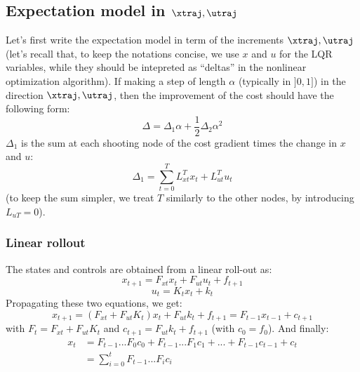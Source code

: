 \documentclass[10pt,a4paper]{article}
\begin{document}
\subsection{Expectation model in $\xtraj,\utraj$}
Let's first write the expectation model in term of the increments $\xtraj,\utraj$ (let's recall that, to keep the notations concise, we use $x$ and $u$ for the LQR variables, while they should be intepreted as ``deltas'' in the nonlinear optimization algorithm).
If making a step of length $\alpha$ (typically in $]0,1]$) in the direction $\xtraj,\utraj$, then the improvement of the cost should have the following form:
$$\Delta = \Delta_1 \alpha + \frac{1}{2} \Delta_2 \alpha^2$$
$\Delta_1$ is the sum at each shooting node of the cost gradient times the change in $x$ and $u$:
\begin{equation}
  \label{eq:d1}
  \Delta_1 = \sum_{t=0}^T L_{xt}^T x_t + L_{ut}^T u_t
\end{equation}
(to keep the sum simpler, we treat $T$ similarly to the other nodes, by introducing $L_{uT} = 0$).

\subsubsection{Linear rollout}
The states and controls are obtained from a linear roll-out as:
$$ x_{t+1} = F_{xt} x_t + F_{ut} u_t + f_{t+1}$$
$$ u_{t} = K_t x_t + k_t$$
Propagating these two equations, we get:
$$ x_{t+1} = (F_{xt} + F_{ut} K_t) x_t + F_{ut} k_t + f_{t+1} =  F_{t-1} x_{t-1} + c_{t+1}$$
with $F_{t} = F_{xt} + F_{ut} K_t$ and $c_{t+1} = F_{ut} k_{t} + f_{t+1}$ (with $c_0 = f_0$).
And finally:
\begin{align}
  x_t &= F_{t-1} ... F_0 c_0 + F_{t-1} ... F_1 c_1 + ... + F_{t-1} c_{t-1} + c_t \\
  &= \sum_{i=0}^t F_{t-1} ... F_i c_i \label{eq:lroll}
\end{align}
\end{document}
